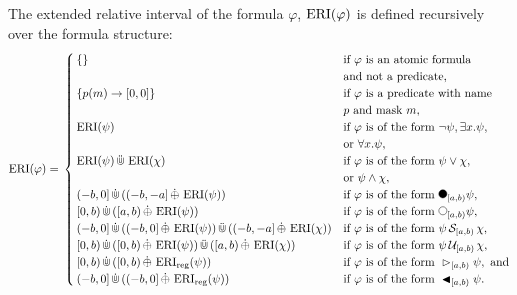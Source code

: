 \begin{definition}
    \label{def:e-rel-int}
    The extended relative interval of the formula $\varphi$, $\operatorname{ERI}(\varphi)$ is defined recursively over the formula structure:
    \begin{equation*}
        \ERI(\varphi) = \\
        \begin{cases}
            \{\} 
                & \text{if } \varphi \text{ is an atomic formula} \\
                & \text{and not a predicate,} \\ 
                \{p(m) \rightarrow [0,0]\} 
                & \text{if } \varphi \text{ is a predicate with name } \\
                & p \text{ and mask } m, \\
            \ERI(\psi) 
                & \text{if } \varphi \text{ is of the form } \neg \psi, \exists x.\psi, \\
                & \text{or } \forall x.\psi, \\
            \ERI(\psi) \Cupmerge \ERI(\chi) 
                & \text{if } \varphi \text{ is of the form } \psi \lor \chi, \\
                & \text{or } \psi \land \chi, \\
            (-b,0] \Cupext ((-b,-a] \oplusext \ERI(\psi)) 
                & \text{if } \varphi \text{ is of the form } \Previous{[a,b)} \psi, \\
            [0,b) \Cupext ([a,b) \oplusext \ERI(\psi)) 
                & \text{if } \varphi \text{ is of the form } \Next{[a,b)} \psi,\\
            (-b,0] \Cupext ((-b,0] \oplusext \ERI(\psi)) \Cupmerge ((-b,-a] \oplusext \ERI(\chi)) 
                & \text{if } \varphi \text{ is of the form } \psi \Since{[a,b)} \chi, \\
            [0,b) \Cupext ([0,b) \oplusext \ERI(\psi)) \Cupmerge ([a,b) \oplusext \ERI(\chi)) 
                & \text{if } \varphi \text{ is of the form } \psi \Until{[a,b)} \chi, \\
            [0,b) \Cupext ([0,b) \oplusext \ERIr(\psi)) 
                & \text{if } \varphi \text{ is of the form } \Fregex{[a,b)} \psi, \text{ and}\\
            (-b,0] \Cupext ((-b,0] \oplusext \ERIr(\psi)) 
                & \text{if } \varphi \text{ is of the form } \Pregex{[a,b)} \psi.\\
        \end{cases}
    \end{equation*}
\end{definition}

